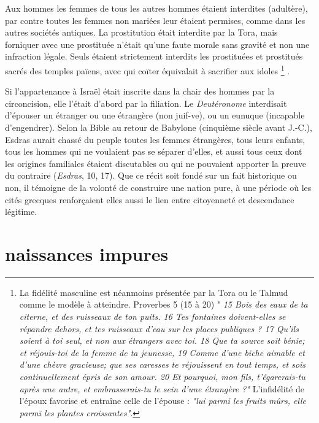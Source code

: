  Aux hommes les femmes de tous les autres hommes étaient interdites (adultère), par contre toutes les femmes non mariées leur étaient permises, comme dans les autres sociétés antiques. La prostitution était interdite par la Tora, mais forniquer avec une prostituée n'était qu'une faute morale sans gravité et non une infraction légale. Seuls étaient strictement interdits les prostituées et prostitués sacrés des temples païens, avec qui coïter équivalait à sacrifier aux idoles%
\footnote{La fidélité masculine est néanmoins présentée par la Tora ou le Talmud comme le modèle à atteindre. Proverbes 5 (15 à 20) "\emph{
15 Bois des eaux de ta citerne, et des ruisseaux de ton puits.
16 Tes fontaines doivent-elles se répandre dehors, et tes ruisseaux d'eau sur les places publiques ?
17 Qu'ils soient à toi seul, et non aux étrangers avec toi.
18 Que ta source soit bénie; et réjouis-toi de la femme de ta jeunesse,
19 Comme d'une biche aimable et d'une chèvre gracieuse; que ses caresses te réjouissent en tout temps, et sois continuellement épris de son amour.
20 Et pourquoi, mon fils, t'égarerais-tu après une autre, et embrasserais-tu le sein d'une étrangère ?"} L'infidélité de l'époux favorise et entraîne celle de l'épouse : \emph{"lui parmi les fruits mûrs, elle parmi les plantes croissantes"}. 
}%
. 

 



 
 
 



Si l'appartenance à Israël était inscrite dans la chair des hommes par la circoncision,  elle l'était d'abord par la filiation. Le \emph{Deutéronome} interdisait d'épouser un étranger ou une étrangère (non juif-ve), ou un eunuque (incapable d'engendrer). Selon la Bible au retour de Babylone (cinquième siècle avant J.-C.), Esdras aurait chassé du peuple toutes les femmes étrangères, tous leurs enfants, tous les hommes qui ne voulaient pas se séparer d'elles, et aussi tous ceux dont les origines familiales étaient discutables ou qui ne pouvaient apporter la preuve du contraire (\emph{Esdras}, 10, 17). Que ce récit soit fondé sur un fait historique ou non, il témoigne de la volonté de construire une nation pure, à une période où les cités grecques renforçaient elles aussi le lien entre citoyenneté et descendance légitime. 

\section{naissances impures}
 
